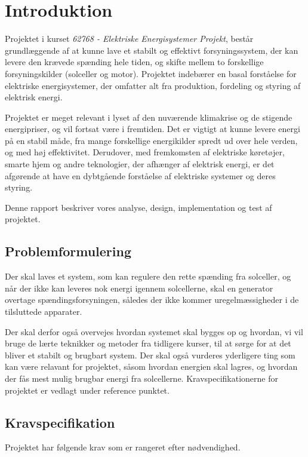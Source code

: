 \documentclass[../main.tex]{subfiles}
\begin{document}
\chapter{Introduktion}
Projektet i kurset \emph{62768 - Elektriske Energisystemer Projekt}, består grundlæggende af at kunne lave et stabilt og effektivt forsyningssystem, der kan levere den krævede spænding hele tiden, og skifte mellem to forskellige forsyningskilder (solceller og motor).  Projektet indebærer en basal forståelse for elektriske energisystemer, der omfatter alt fra produktion, fordeling og styring af elektrisk energi. 

Projektet er meget relevant i lyset af den nuværende klimakrise og de stigende energipriser, og vil fortsat være i fremtiden. Det er vigtigt at kunne levere energi på en stabil måde, fra mange forskellige energikilder spredt ud over hele verden, og med høj effektivitet. Derudover, med fremkomsten af elektriske køretøjer, smarte hjem og andre teknologier, der afhænger af elektrisk energi, er det afgørende at have en dybtgående forståelse af elektriske systemer og deres styring.

Denne rapport beskriver vores analyse, design, implementation og test af projektet.

\section{Problemformulering}
Der skal laves et system, som kan regulere den rette spænding fra solceller, og når der ikke kan leveres nok energi igennem solcellerne, skal en generator overtage spændingsforsyningen, således der ikke kommer uregelmæssigheder i de tilsluttede apparater. 

Der skal derfor også overvejes hvordan systemet skal bygges op og hvordan, vi vil bruge de lærte teknikker og metoder fra tidligere kurser, til at sørge for at det bliver et stabilt og brugbart system. Der skal også vurderes yderligere ting som kan være relavant for projektet, såsom hvordan energien skal lagres, og hvordan der fås mest mulig brugbar energi fra solcellerne. Kravspecifikationerne for projektet er vedlagt under reference punktet.

\section{Kravspecifikation}
Projektet har følgende krav som er rangeret efter nødvendighed.
\end{document}
